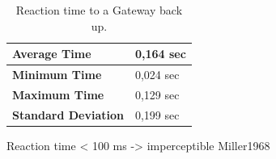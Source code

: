 \begin{table}[H]
	
	\begin{tabular}{|l|l|}
		\hline
		\textbf{Average Time}       & 0,164 sec \\ \hline
		\textbf{Minimum Time}       & 0,024 sec \\ \hline
		\textbf{Maximum Time}       & 0,129 sec \\ \hline
		\textbf{Standard Deviation} & 0,199 sec \\ \hline
	\end{tabular}
	\centering
	\caption{Reaction time to a Gateway back up.}
	\label{gwup}
\end{table}


Reaction time < 100 ms -> imperceptible 
Miller1968